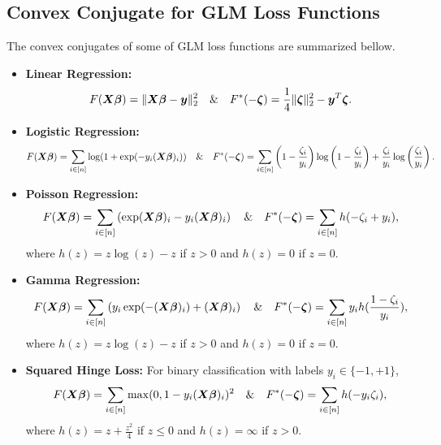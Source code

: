 \subsection{Convex Conjugate for GLM Loss Functions}
\label{appendix_sec:convex_conjugate_for_GLM_loss_functions}

The convex conjugates of some of GLM loss functions are summarized bellow.
\begin{itemize}[label=$\diamond$,leftmargin=*]
    \item \textbf{Linear Regression:} 
    $$F(\bm{X} \bm{\beta}) = \lVert \bm{X} \bm{\beta} - \bm{y} \rVert_2^2 \quad \& \quad F^*(-\bm{\zeta}) = \frac{1}{4} \lVert \bm{\zeta} \rVert_2^2 - \bm{y}^T \bm{\zeta}.$$
    \item \textbf{Logistic Regression:} 
    $$F(\bm{X} \bm{\beta}) = \sum_{i \in [n]} \log(1 + \exp(-y_i (\bm{X} \bm{\beta})_i)) \quad \& \quad F^*(-\bm{\zeta}) = \sum_{i \in [n]} \left( 1- \frac{\zeta_i}{y_i} \right) \log \left( 1-\frac{\zeta_i}{y_i} \right) + \frac{\zeta_i}{y_i} \log \left( \frac{\zeta_i}{y_i} \right).$$ 
    \item \textbf{Poisson Regression:} 
    $$F(\bm{X} \bm{\beta}) = \sum_{i \in [n]} \left( \exp(\bm{X} \bm{\beta})_i - y_i (\bm{X} \bm{\beta})_i \right) \quad \& \quad F^*(-\bm{\zeta}) = \sum_{i \in [n]} h(-\zeta_i + y_i), $$
    where $h(z) = z \log(z) - z$ if $z > 0$ and $h(z)=0$ if $z = 0$.
    \item \textbf{Gamma Regression:}
    $$F(\bm{X} \bm{\beta}) = \sum_{i \in [n]} \left( y_i \exp(-(\bm{X} \bm{\beta})_i) + (\bm{X} \bm{\beta})_i\right) \quad \& \quad F^*(-\bm{\zeta}) = \sum_{i \in [n]} y_i h(\frac{1-\zeta_i}{y_i}), $$
    where $h(z) = z \log(z) - z$ if $z > 0$ and $h(z)=0$ if $z = 0$.
    \item \textbf{Squared Hinge Loss:}
    For binary classification with labels $y_i \in \{-1, +1\}$,
    $$F(\bm{X} \bm{\beta}) = \sum_{i \in [n]} \max(0, 1-y_i (\bm{X} \bm{\beta})_i)^2 \quad \& \quad F^*(-\bm{\zeta}) = \sum_{i \in [n]}  h(- y_i \zeta_i),$$
    where $h(z) = z + \frac{z^2}{4}$ if $z \leq 0$ and $h(z)=\infty$ if $z > 0$.
\end{itemize}




